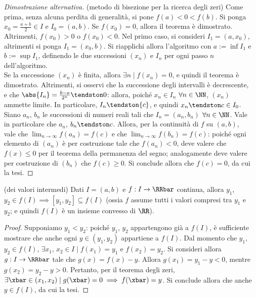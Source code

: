 \documentclass[11pt]{article}
\begin{document}
	\begin{proof}[Dimostrazione alternativa] (metodo di bisezione per la ricerca degli zeri)
		Come prima, senza alcuna perdita di generalità, si pone $f(a) < 0 < f(b)$. Si ponga $x_0 = \frac{a+b}{2} \in I$ e
		$I_0 = (a, b)$.
		Se $f(x_0) = 0$, allora il teorema è dimostrato. Altrimenti, $f(x_0) > 0$ o $f(x_0) < 0$. Nel primo caso,
		si consideri $I_1 = (a, x_0)$, altrimenti si ponga $I_1 = (x_0, b)$. Si riapplichi allora l'algoritmo con $a := \inf I_1$ e $b := \sup I_1$, definendo le due successioni $(x_n)$ e $I_n$ per ogni passo $n$ dell'algoritmo. \\
		
		Se la successione $(x_n)$ è finita, allora $\exists n \mid f(x_n) = 0$, e quindi il teorema è dimostrato. Altrimenti,
		si osservi che la successione degli intervalli è decrescente, e che $\abs{I_n} = \frac{b-a}{2^n} \tendston 0$:
		allora, poiché $x_n \in I_n$ $\forall n \in \NN$, $(x_n)$ ammette limite. In particolare, $I_n \tendston \{c\}$,
		e quindi $x_n \tendston c \in I_0$. Siano $a_n$, $b_n$ le successioni di numeri reali tali che $I_n = (a_n, b_n)$ $\forall n \in \NN$.
		Vale in particolare che $a_n$, $b_n \tendston c$. Allora, per la continuità di $f$ su $(a, b)$, vale che
		$\lim_{n \to \infty} f(a_n) = f(c)$ e che $\lim_{n \to \infty} f(b_n) = f(c)$: poiché ogni elemento di $(a_n)$ è
		per costruzione tale che $f(a_n) < 0$, deve valere che $f(x) \leq 0$ per il teorema della permanenza del segno; analogamente deve valere per costruzione di $(b_n)$ che $f(c) \geq 0$. Si conclude allora che $f(c) = 0$, da cui
		la tesi.
	\end{proof}

	\begin{theorem} (dei valori intermedi) Dati $I = (a, b)$ e
		$f : I \to \RRbar$ continua, allora $y_1$, $y_2 \in f(I) \implies
		[y_1, y_2] \subseteq f(I)$ (ossia $f$ assume tutti i valori
		compresi tra $y_1$ e $y_2$; e quindi $f(I)$ è un insieme convesso di $\RR$).
	\end{theorem}

	\begin{proof}
		Supponiamo $y_1 < y_2$: poiché $y_1$, $y_2$ appartengono già a $f(I)$, è sufficiente mostrare che anche ogni $y \in (y_1, y_2)$ appartiene a $f(I)$. Dal momento che $y_1$, $y_2 \in f(I)$, $\exists x_1$, $x_2 \in I \mid f(x_1) = y_1$ e $f(x_2) = y_2$. Si consideri allora $g : I \to \RRbar$ tale che
		$g(x) = f(x) - y$. Allora $g(x_1) = y_1 - y < 0$, mentre $g(x_2) = y_2 - y > 0$. Pertanto, per il teorema
		degli zeri, $\exists \xbar \in (x_1, x_2) \mid g(\xbar) = 0 \implies f(\xbar) = y$. Si conclude allora che anche
		$y \in f(I)$, da cui la tesi. 
	\end{proof}
\end{document}
